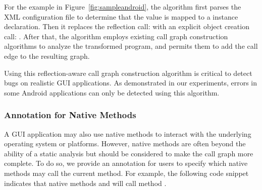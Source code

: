 For the example in Figure~\ref{fig:sampleandroid}, the algorithm
first parses the XML configuration file to determine that the 
value is mapped to a  instance declaration. Then it
replaces the reflection call:  
with an explicit object creation call: .
After that, the algorithm employs existing call graph construction
algorithms to analyze the transformed program, and permits them
to add the call edge  to the resulting graph.

Using this reflection-aware call graph construction algorithm is
critical to detect bugs on realistic GUI applications.
As demonstrated in our experiments, errors in some Android applications
can only be detected using this algorithm.



\subsubsection{Annotation for Native Methods}
\label{sec:annotation}

A GUI application may also use native methods to interact with the underlying
operating system or platforms. However, native methods are often
beyond the ability of a static analysis but should be considered to make
the call graph more complete. To do so, we provide an annotation 
for users to specify which native methods may call the current method. For example,
the following code snippet indicates that native methods  and 
will call method .

{}

